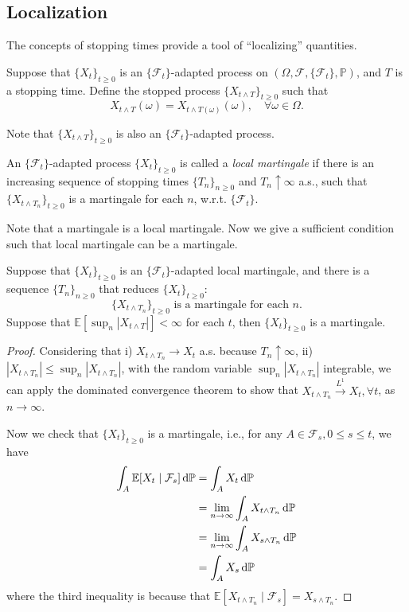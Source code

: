 \subsection{Localization}

The concepts of stopping times provide a tool of ``localizing'' quantities.
\begin{definition}
Suppose that $\{X_t\}_{t\ge0}$ is an $\{\mathcal{F}_t\}$-adapted process
on $(\Omega,\mathcal{F},\{\mathcal{F}_t\},\mathbb{P})$,
and $T$ is a stopping time.
Define the stopped process $\{X_{t\land T}\}_{t\ge0}$ such that 
\[
X_{t\land T}(\omega) = X_{t\land T(\omega)}(\omega),\quad\forall\omega\in\Omega.
\]
\end{definition}
Note that $\{X_{t\land T}\}_{t\ge0}$ is also an $\{\mathcal{F}_t\}$-adapted process.

\begin{definition}
An $\{\mathcal{F}_t\}$-adapted process $\{X_t\}_{t\ge0}$ is called a \emph{local martingale}
if there is an increasing sequence of stopping times $\{T_n\}_{n\ge0}$
and $T_n\uparrow\infty$ a.s.,
such that $\{X_{t\land T_n}\}_{t\ge0}$ is a martingale for each $n$, w.r.t. $\{\mathcal{F}_t\}$.
\end{definition}
Note that a martingale is a local martingale.
Now we give a sufficient condition such that local martingale can be a martingale.
\begin{theorem}
Suppose that $\{X_t\}_{t\ge0}$ is an $\{\mathcal{F}_t\}$-adapted local martingale,
and there is a sequence $\{T_n\}_{n\ge0}$ that reduces $\{X_t\}_{t\ge0}$:
\[
\mbox{$\{X_{t\land T_n}\}_{t\ge0}$ is a martingale for each $n$}.
\]
Suppose that $\mathbb{E}[\sup_n|X_{t\land T}|]<\infty$ for each $t$,
then $\{X_t\}_{t\ge0}$ is a martingale.
\end{theorem}

\begin{proof}
Considering that i) $X_{t\land T_n}\to X_t$ a.s. because $T_n\uparrow\infty$,
ii) $|X_{t\land T_n}|\le \sup_n|X_{t\land T_n}|$, with the random variable $\sup_n|X_{t\land T_n}|$ integrable, we can apply the dominated convergence theorem to show that 
$X_{t\land T_n}\xrightarrow{L^1}X_t,\forall t$, as $n\to\infty$.

Now we check that $\{X_t\}_{t\ge0}$ is a martingale, i.e., for any $A\in\mathcal{F}_s,0\le s\le t$, we have
\begin{align*}
\int_A\mathbb{E}[X_t\mid\mathcal{F}_s]\,\mathrm{d}\mathbb{P}&=
\int_AX_t\,\mathrm{d}\mathbb{P}\\
&=\lim_{n\to\infty}\int_AX_{t\land T_n}\,\mathrm{d}\mathbb{P}\\
&=\lim_{n\to\infty}\int_AX_{s\land T_n}\,\mathrm{d}\mathbb{P}\\
&=\int_AX_s\,\mathrm{d}\mathbb{P}
\end{align*}
where the third inequality is because that $\mathbb{E}[X_{t\land T_n}\mid\mathcal{F}_s]=
X_{s\land T_n}$.
\end{proof}

